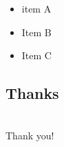 \documentclass{beamer}
\begin{document}
\begin{frame}
\frametitle{\subsecname}
    \begin{itemize}
      \item
      item A
      \item
      Item B
      \item
      Item C
    \end{itemize}
\end{frame}

\subsection*{Thanks}

\begin{frame}
\frametitle{\subsecname}
  \begin{columns}
  \column{2.5cm}
  \column{5cm}
    \Huge{Thank you!}
  \column{2.5cm}
  \end{columns}
\end{frame}
\end{document}
